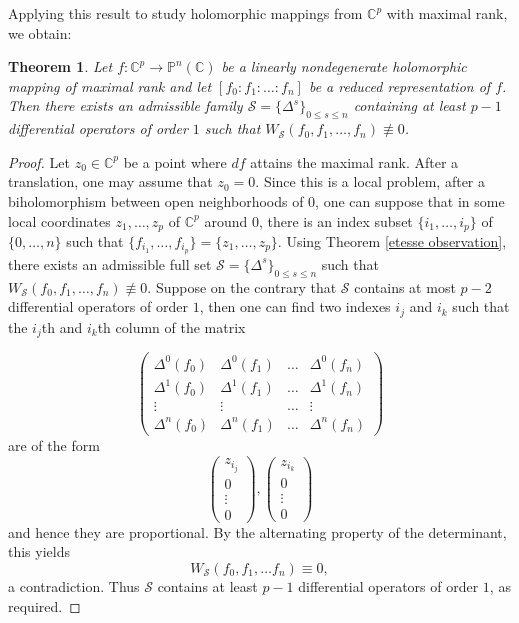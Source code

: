 \documentclass[english, 12pt]{amsart}
\theoremstyle{plain}
\newtheorem{thm}{Theorem}[section]
\theoremstyle{remark}
\numberwithin{equation}{section}
\theoremstyle{plain}
\theoremstyle{named}
\begin{document}
Applying this result to study holomorphic mappings from $\mathbb{C}^p$ with maximal rank, we obtain:
\begin{thm}
	\label{generalized wronskian for maximal rank holo mapping Cp to CPn}
Let $f\colon\mathbb{C}^p\rightarrow\mathbb{P}^n(\mathbb{C})$ be a linearly nondegenerate holomorphic mapping of maximal rank and let $[f_0:f_1:\dots:f_n]$ be a reduced representation of $f$. Then there exists an admissible family $\mathcal{S}=\{\Delta^s\}_{0\leq s\leq n}$ containing at least $p-1$ differential operators of order $1$ such that $W_{\mathcal{S}}(f_0,f_1,\dots,f_n)\not\equiv 0$. 
\end{thm}
\begin{proof}
	Let $z_0\in\mathbb{C}^p$ be a point where $df$ attains the maximal rank. After a translation, one may assume that $z_0=0$. Since this is a local problem, after a biholomorphism between  open neighborhoods of $0$, one can suppose that in some local coordinates $z_1,\dots,z_p$ of $\mathbb{C}^p$ around $0$, there is an index subset $\{i_1,\dots,i_p\}$ of $\{0,\dots,n\}$ such that $\{f_{i_1},\dots,f_{i_p}\}=\{z_1,\dots,z_p\}$. Using Theorem \ref{etesse observation}, there exists an admissible full set $\mathcal{S}=\{\Delta^s\}_{0\leq s\leq n}$ such that $W_{\mathcal{S}}(f_0,f_1,\dots,f_n)\not\equiv 0$. Suppose on the contrary that $\mathcal{S}$ contains at most $p-2$ differential operators of order $1$, then one can find two indexes $i_j$ and $i_k$ such that the $i_j$th and $i_k$th column of the matrix

$$ \begin{pmatrix}
	\Delta^0 (f_0)&\Delta^0({f_1})&\dots&\Delta^0(f_n)\\
	\Delta^1(f_0)&\Delta^1(f_1)&\dots&\Delta^1(f_n)\\
	\vdots&\vdots&\dots&\vdots\\
	\Delta^n(f_0)&\Delta^n(f_1)&\dots&\Delta^n(f_n)
\end{pmatrix}$$
are of the form
$$
 \begin{pmatrix}
z_{i_j}\\
0\\
\vdots\\
0
\end{pmatrix},
 \begin{pmatrix}
z_{i_k}\\
0\\
\vdots\\
0
\end{pmatrix}$$
and hence they are proportional. By the alternating property of the determinant, this yields $$
W_{\mathcal{S}}(f_0,f_1,\dots f_n)\equiv 0,
$$
a contradiction. Thus  $\mathcal{S}$ contains at least $p-1$ differential operators of order $1$, as required.
\end{proof}
\end{document}
